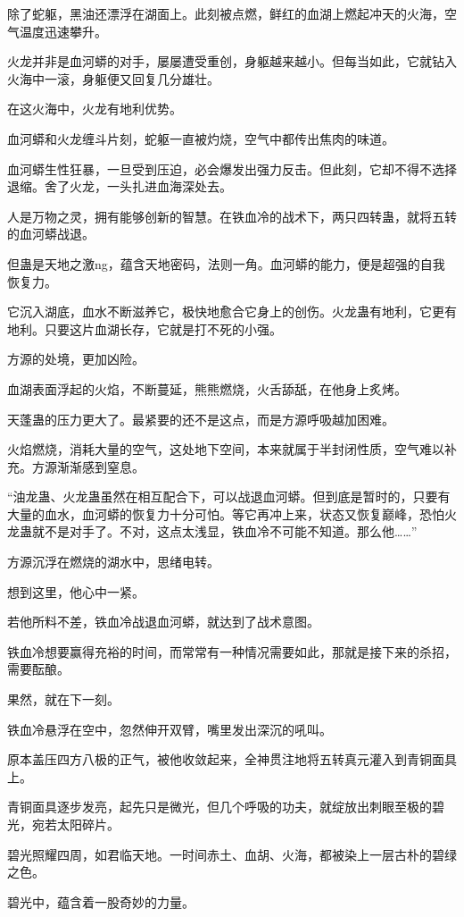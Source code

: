 \begin{this_body}
除了蛇躯，黑油还漂浮在湖面上。此刻被点燃，鲜红的血湖上燃起冲天的火海，空气温度迅速攀升。

火龙并非是血河蟒的对手，屡屡遭受重创，身躯越来越小。但每当如此，它就钻入火海中一滚，身躯便又回复几分雄壮。

在这火海中，火龙有地利优势。

血河蟒和火龙缠斗片刻，蛇躯一直被灼烧，空气中都传出焦肉的味道。

血河蟒生性狂暴，一旦受到压迫，必会爆发出强力反击。但此刻，它却不得不选择退缩。舍了火龙，一头扎进血海深处去。

人是万物之灵，拥有能够创新的智慧。在铁血冷的战术下，两只四转蛊，就将五转的血河蟒战退。

但蛊是天地之激ng，蕴含天地密码，法则一角。血河蟒的能力，便是超强的自我恢复力。

它沉入湖底，血水不断滋养它，极快地愈合它身上的创伤。火龙蛊有地利，它更有地利。只要这片血湖长存，它就是打不死的小强。

方源的处境，更加凶险。

血湖表面浮起的火焰，不断蔓延，熊熊燃烧，火舌舔舐，在他身上炙烤。

天蓬蛊的压力更大了。最紧要的还不是这点，而是方源呼吸越加困难。

火焰燃烧，消耗大量的空气，这处地下空间，本来就属于半封闭性质，空气难以补充。方源渐渐感到窒息。

“油龙蛊、火龙蛊虽然在相互配合下，可以战退血河蟒。但到底是暂时的，只要有大量的血水，血河蟒的恢复力十分可怕。等它再冲上来，状态又恢复巅峰，恐怕火龙蛊就不是对手了。不对，这点太浅显，铁血冷不可能不知道。那么他……”

方源沉浮在燃烧的湖水中，思绪电转。

想到这里，他心中一紧。

若他所料不差，铁血冷战退血河蟒，就达到了战术意图。

铁血冷想要赢得充裕的时间，而常常有一种情况需要如此，那就是接下来的杀招，需要酝酿。

果然，就在下一刻。

铁血冷悬浮在空中，忽然伸开双臂，嘴里发出深沉的吼叫。

原本盖压四方八极的正气，被他收敛起来，全神贯注地将五转真元灌入到青铜面具上。

青铜面具逐步发亮，起先只是微光，但几个呼吸的功夫，就绽放出刺眼至极的碧光，宛若太阳碎片。

碧光照耀四周，如君临天地。一时间赤土、血胡、火海，都被染上一层古朴的碧绿之色。

碧光中，蕴含着一股奇妙的力量。


\end{this_body}

